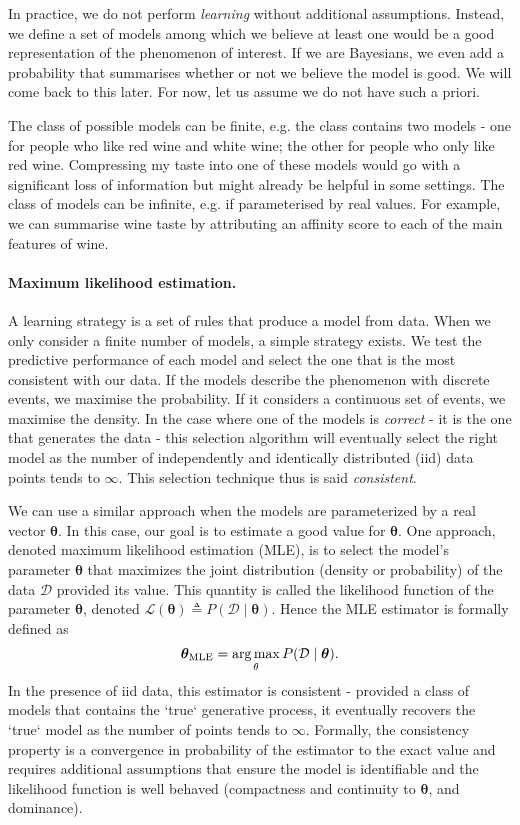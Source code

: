 In practice, we do not perform \textit{learning} without additional assumptions. Instead, we define a set of models among which we believe at least one would be a good representation of the phenomenon of interest. If we are Bayesians, we even add a probability that summarises whether or not we believe the model is good. We will come back to this later. For now, let us assume we do not have such a priori.

The class of possible models can be finite, e.g. the class contains two models - one for people who like red wine and white wine; the other for people who only like red wine. Compressing my taste into one of these models would go with a significant loss of information but might already be helpful in some settings. The class of models can be infinite, e.g. if parameterised by real values. For example, we can summarise wine taste by attributing an affinity score to each of the main features of wine.
\paragraph{Maximum likelihood estimation.}
A learning strategy is a set of rules that produce a model from data. When we only consider a finite number of models, a simple strategy exists. We test the predictive performance of each model and select the one that is the most consistent with our data. If the models describe the phenomenon with discrete events, we maximise the probability. If it considers a continuous set of events, we maximise the density. In the case where one of the models is \textit{correct} - it is the one that generates the data - this selection algorithm will eventually select the right model as the number of independently and identically distributed (iid) data points tends to $\infty$. This selection technique thus is said \textit{consistent}.

We can use a similar approach when the models are parameterized by a real vector $\bm{\theta}$. In this case, our goal is to estimate a good value for $\bm{\theta}$. One approach, denoted maximum likelihood estimation (MLE), is to select the model's parameter $\bm{\theta}$ that maximizes the  joint distribution (density or probability) of the data $\mathcal{D}$ provided its value. This quantity is called the likelihood function of the parameter $\bm{\theta}$, denoted $\mathcal{L}(\bm{\theta}) \triangleq P(\mathcal{D}\mid\bm{\theta})$. Hence the MLE estimator is formally defined as
\begin{align}
   \bm{\theta}_{\text{MLE}} = \operatorname*{arg\,max}_{\theta} P(\mathcal{D}\mid\bm{\theta}). \label{eq:chap02:MLE}
\end{align}
In the presence of iid data, this estimator is consistent - provided a class of models that contains the `true` generative process, it eventually recovers the `true` model as the number of points tends to $\infty$. Formally, the consistency property is a convergence in probability of the estimator to the exact value and requires additional assumptions that ensure the model is identifiable and the likelihood function is well behaved (compactness and continuity to $\bm{\theta}$, and dominance).

